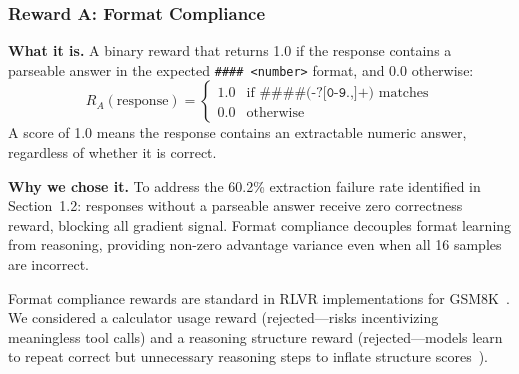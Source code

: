 \subsubsection{Reward A: Format Compliance}
\nestindent

\textbf{What it is.}
A binary reward that returns 1.0 if the response contains a parseable answer in the expected \texttt{\#\#\#\# <number>} format, and 0.0 otherwise:
\[
R_A(\text{response}) =
\begin{cases}
1.0 & \text{if } \texttt{\#\#\#\# (-?[0-9.,]+)} \text{ matches} \\
0.0 & \text{otherwise}
\end{cases}
\]
A score of 1.0 means the response contains an extractable numeric answer, regardless of whether it is correct.

\textbf{Why we chose it.}
To address the 60.2\% extraction failure rate identified in Section~1.2: responses without a parseable answer receive zero correctness reward, blocking all gradient signal.
Format compliance decouples format learning from reasoning, providing non-zero advantage variance even when all 16 samples are incorrect.

Format compliance rewards are standard in RLVR implementations for GSM8K~\cite{gsm8k_rlvr, verl, unsloth}.
We considered a calculator usage reward (rejected---risks incentivizing meaningless tool calls) and a reasoning structure reward (rejected---models learn to repeat correct but unnecessary reasoning steps to inflate structure scores~\cite{gao2024reward}).
\nestunindent

